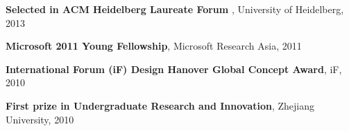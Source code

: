 \documentclass[margin,line]{res}
\begin{document}
\begin{resume}
%

\textbf{Selected in ACM Heidelberg Laureate Forum }, University of Heidelberg, 2013


\textbf{Microsoft 2011 Young Fellowship}, Microsoft Research Asia, 2011


\textbf{International Forum (iF) Design Hanover Global Concept Award}, iF, 2010 

\textbf{First prize in Undergraduate Research and Innovation}, Zhejiang University, 2010   





%
%
%     
%
%
%	
%	
%
%



\end{resume}
\end{document}
